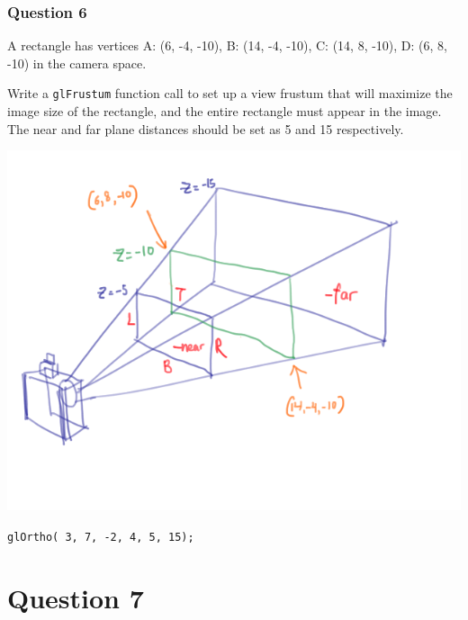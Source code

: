 \documentclass{beamer}
\begin{document}
\begin{frame}
    \frametitle{Question 6}
    A rectangle has vertices A: (6, -4, -10), B: (14, -4, -10), 
    C: (14, 8, -10), D: (6, 8, -10) in the camera space. 

    \vspace{1em}

    Write a \texttt{glFrustum} function call to set up a view frustum that 
    will maximize the image size of the rectangle, and the entire 
    rectangle must appear in the image. The near and far plane 
    distances should be set as 5 and 15 respectively. 
\end{frame}

\begin{frame}

    \begin{center}
        \includegraphics[scale=1.2]{glFrustum-demo.png}
    \end{center}

    \begin{tcolorbox}[colback=violet!5!white]
        \begin{center}
            \texttt{glOrtho( 3, 7, -2, 4, 5, 15);}
        \end{center}
    \end{tcolorbox}

\end{frame}

\section{Question 7}
\end{document}
